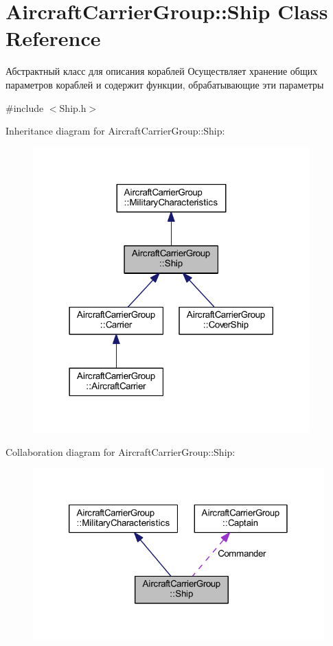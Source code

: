 \hypertarget{class_aircraft_carrier_group_1_1_ship}{}\section{Aircraft\+Carrier\+Group\+:\+:Ship Class Reference}
\label{class_aircraft_carrier_group_1_1_ship}


Абстрактный класс для описания кораблей  Осуществляет хранение общих параметров кораблей и содержит функции, обрабатывающие эти параметры  




{\ttfamily \#include $<$Ship.\+h$>$}



Inheritance diagram for Aircraft\+Carrier\+Group\+:\+:Ship\+:
\nopagebreak
\begin{figure}[H]
\begin{center}
\leavevmode
\includegraphics[width=302pt]{class_aircraft_carrier_group_1_1_ship__inherit__graph}
\end{center}
\end{figure}


Collaboration diagram for Aircraft\+Carrier\+Group\+:\+:Ship\+:
\nopagebreak
\begin{figure}[H]
\begin{center}
\leavevmode
\includegraphics[width=320pt]{class_aircraft_carrier_group_1_1_ship__coll__graph}
\end{center}
\end{figure}
